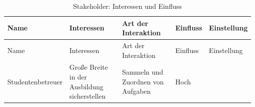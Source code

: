 \documentclass[
  12pt,
  ngerman,
  a4paper,
]{article}
\begin{document}
\begin{longtable}[]{@{}lllll@{}}
\caption{Stakeholder: Interessen und Einfluss
\label{tbl:stakeholder}}\tabularnewline
\toprule
\begin{minipage}[b]{0.25\columnwidth}\raggedright
Name\strut
\end{minipage} & \begin{minipage}[b]{0.23\columnwidth}\raggedright
Interessen\strut
\end{minipage} & \begin{minipage}[b]{0.22\columnwidth}\raggedright
Art der Interaktion\strut
\end{minipage} & \begin{minipage}[b]{0.07\columnwidth}\raggedright
Einfluss\strut
\end{minipage} & \begin{minipage}[b]{0.09\columnwidth}\raggedright
Einstellung\strut
\end{minipage}\tabularnewline
\midrule
\endfirsthead
\toprule
\begin{minipage}[b]{0.25\columnwidth}\raggedright
Name\strut
\end{minipage} & \begin{minipage}[b]{0.23\columnwidth}\raggedright
Interessen\strut
\end{minipage} & \begin{minipage}[b]{0.22\columnwidth}\raggedright
Art der Interaktion\strut
\end{minipage} & \begin{minipage}[b]{0.07\columnwidth}\raggedright
Einfluss\strut
\end{minipage} & \begin{minipage}[b]{0.09\columnwidth}\raggedright
Einstellung\strut
\end{minipage}\tabularnewline
\midrule
\endhead
\begin{minipage}[t]{0.25\columnwidth}\raggedright
Studentenbetreuer\strut
\end{minipage} & \begin{minipage}[t]{0.23\columnwidth}\raggedright
Große Breite in der Ausbildung sicherstellen\strut
\end{minipage} & \begin{minipage}[t]{0.22\columnwidth}\raggedright
Sammeln und Zuordnen von Aufgaben\strut
\end{minipage} & \begin{minipage}[t]{0.07\columnwidth}\raggedright
Hoch\strut
\end{minipage} & \begin{minipage}[t]{0.09\columnwidth}\raggedright

\end{minipage}
\end{longtable}
\end{document}
